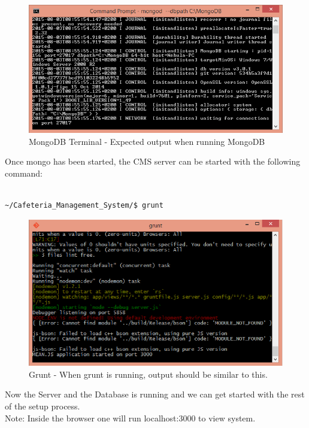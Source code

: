 \documentclass[a4paper,12pt]{article}
\begin{document}
\begin{figure}[H]
  \centering
    \includegraphics[width=1.0\textwidth]{screenshots/MongoDB.png}
    \caption{MongoDB Terminal - Expected output when running MongoDB} 
\end{figure}

Once mongo has been started, the CMS server can be started with the following command:\\ \\

\begin{verbatim}
~/Cafeteria_Management_System/$ grunt
\end{verbatim}

\begin{figure}[H]
  \centering
    \includegraphics[width=1.0\textwidth]{screenshots/gruntOutput.png}
    \caption{Grunt - When grunt is running, output should be similar to this.} 
\end{figure}

Now the Server and the Database is running and we can get started with the rest of the setup process. \\
Note: Inside the browser one will run localhost:3000 to view  system. \\ 
\end{document}
